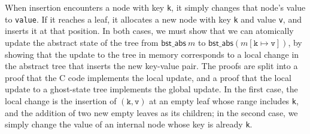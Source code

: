 \documentclass[runningheads]{llncs}
\newcommand{\treerep}{\ensuremath{\mathsf{bst\_abs}}}
\begin{document}
When insertion encounters a node with key \lstinline{k}, it simply changes that node's value to \lstinline{value}. If it reaches a leaf, it allocates a new node with key \lstinline{k} and value \lstinline{v}, and inserts it at that position.
In both cases, we must show that we can atomically update the abstract state of the tree from $\treerep\ m$ to $\treerep (m[\texttt{k}\mapsto \texttt{v}])$, by showing that the update to the tree in memory corresponds to a local change in the abstract tree that inserts the new key-value pair. The proofs are split into a proof that the C code implements the local update, and a proof that the local update to a ghost-state tree implements the global update. In the first case, the local change is the insertion of $(\texttt{k}, \texttt{v})$ at an empty leaf whose range includes \lstinline{k}, and the addition of two new empty leaves as its children; in the second case, we simply change the value of an internal node whose key is already \lstinline{k}. 
  
\end{document}
